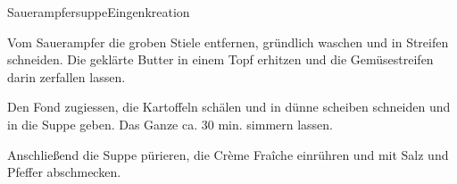 \begin{recipe}{Sauerampfersuppe}{Eingenkreation}
  \inglist

  \steps
  Vom Sauerampfer die groben Stiele entfernen, gründlich waschen und in Streifen
  schneiden. Die geklärte Butter in einem Topf erhitzen und die Gemüsestreifen darin
  zerfallen lassen.

  Den Fond zugiessen, die Kartoffeln schälen und in dünne scheiben schneiden und in die
  Suppe geben. Das Ganze ca. 30 min. simmern lassen.

  Anschließend die Suppe pürieren, die Crème Fraîche einrühren und mit Salz und Pfeffer
  abschmecken.
\end{recipe}

